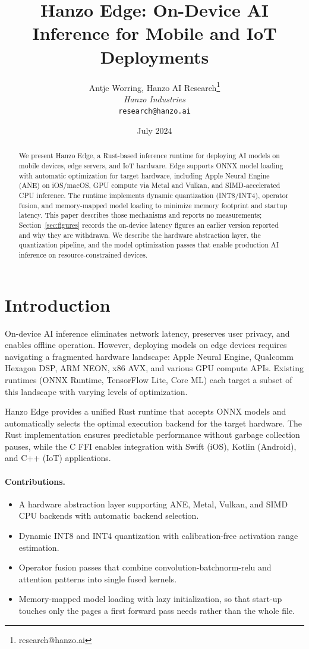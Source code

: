 \documentclass[11pt,twocolumn]{article}
\title{Hanzo Edge: On-Device AI Inference for Mobile and IoT Deployments}
\author{Antje Worring, Hanzo AI Research\thanks{research@hanzo.ai} \\ \textit{Hanzo Industries} \\ \texttt{research@hanzo.ai}}
\date{July 2024}
\begin{document}
\hanzocoverpage

\begin{abstract}
We present Hanzo Edge, a Rust-based inference runtime for deploying AI models on mobile devices, edge servers, and IoT hardware. Edge supports ONNX model loading with automatic optimization for target hardware, including Apple Neural Engine (ANE) on iOS/macOS, GPU compute via Metal and Vulkan, and SIMD-accelerated CPU inference. The runtime implements dynamic quantization (INT8/INT4), operator fusion, and memory-mapped model loading to minimize memory footprint and startup latency. This paper describes those mechanisms and reports no measurements; Section~\ref{sec:figures} records the on-device latency figures an earlier version reported and why they are withdrawn. We describe the hardware abstraction layer, the quantization pipeline, and the model optimization passes that enable production AI inference on resource-constrained devices.
\end{abstract}

\section{Introduction}

On-device AI inference eliminates network latency, preserves user privacy, and enables offline operation. However, deploying models on edge devices requires navigating a fragmented hardware landscape: Apple Neural Engine, Qualcomm Hexagon DSP, ARM NEON, x86 AVX, and various GPU compute APIs. Existing runtimes (ONNX Runtime, TensorFlow Lite, Core ML) each target a subset of this landscape with varying levels of optimization.

Hanzo Edge provides a unified Rust runtime that accepts ONNX models and automatically selects the optimal execution backend for the target hardware. The Rust implementation ensures predictable performance without garbage collection pauses, while the C FFI enables integration with Swift (iOS), Kotlin (Android), and C++ (IoT) applications.

\paragraph{Contributions.}
\begin{itemize}
    \item A hardware abstraction layer supporting ANE, Metal, Vulkan, and SIMD CPU backends with automatic backend selection.
    \item Dynamic INT8 and INT4 quantization with calibration-free activation range estimation.
    \item Operator fusion passes that combine convolution-batchnorm-relu and attention patterns into single fused kernels.
    \item Memory-mapped model loading with lazy initialization, so that start-up touches only the pages a first forward pass needs rather than the whole file.
\end{itemize}
\end{document}
